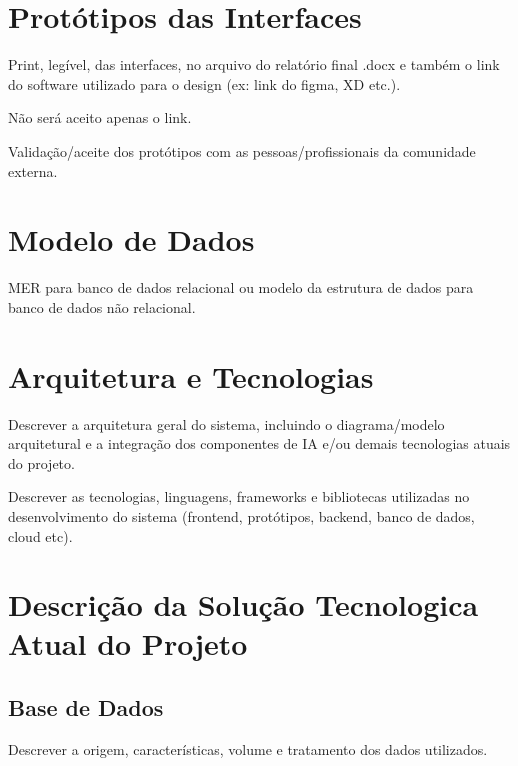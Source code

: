 \documentclass[
    12pt,           %
    oneside,        %
    a4paper,        %
    chapter=TITLE,  %
    english,        %
    brazil          %
]{abntex2}
\begin{document}
\chapter{Protótipos das Interfaces}

Print, legível, das interfaces, no arquivo do relatório final .docx e também o link do
software utilizado para o design (ex: link do figma, XD etc.).

Não será aceito apenas o link.

Validação/aceite dos protótipos com as pessoas/profissionais da comunidade externa.

\chapter{Modelo de Dados}

MER para banco de dados relacional ou modelo da estrutura de dados para banco de dados
não relacional.


\chapter{Arquitetura e Tecnologias}

Descrever a arquitetura geral do sistema, incluindo o diagrama/modelo arquitetural e a
integração dos componentes de IA e/ou demais tecnologias atuais do projeto.

Descrever as tecnologias, linguagens, frameworks e bibliotecas utilizadas no
desenvolvimento do sistema (frontend, protótipos, backend, banco de dados, cloud etc).

\chapter{Descrição da Solução Tecnologica Atual do Projeto}

\section{Base de Dados}
Descrever a origem, características, volume e tratamento dos dados utilizados.
\end{document}
